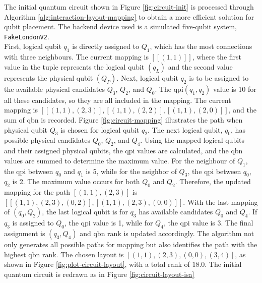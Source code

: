 \begin{example} %
The initial quantum circuit shown in Figure \ref{fig:circuit-init} is processed through Algorithm \ref{alg:interaction-layout-mapping}  to obtain a more efficient solution for qubit placement. The backend device used is a simulated five-qubit system, \lstinline{FakeLondonV2}. \\
First, logical qubit $q_1$ is directly assigned to $Q_1$, which has the most connections with three neighbours. The current mapping is $[[(1, 1)]]$, where the first value in the tuple represents the logical qubit $(q_L)$ and the second value represents the physical qubit $(Q_P)$. Next, logical qubit $q_2$ is to be assigned to the available physical candidates $Q_3$, $Q_2$, and $Q_0$. The \acrshort{qpi}$(q_1, q_2)$ value is 10 for all these candidates, so they are all included in the mapping. The current mapping is $[[(1, 1), (2, 3)], [(1, 1), (2, 2)], [(1, 1), (2, 0)]]$, and the sum of \acrshort{qbn} is recorded. Figure \ref{fig:circuit-mapping} illustrates the path when physical qubit $Q_3$ is chosen for logical qubit $q_2$. The next logical qubit, $q_0$, has possible physical candidates $Q_0$, $Q_2$, and $Q_4$. Using the mapped logical qubits and their assigned physical qubits, the \acrshort{qpi} values are calculated, and the \acrshort{qbn} values are summed to determine the maximum value. For the neighbour of $Q_1$, the \acrshort{qpi} between $q_0$ and $q_1$ is 5, while for the neighbor of $Q_3$, the \acrshort{qpi} between $q_0$, $q_2$ is 2. The maximum value occurs for both $Q_0$ and $Q_2$. Therefore, the updated mapping for the path $[(1, 1), (2, 3)]$ is $[[(1, 1), (2, 3), (0, 2)], [(1, 1), (2, 3), (0, 0)]]$. With the last mapping of $(q_0, Q_2)$, the last logical qubit is for $q_3$ has available candidates $Q_0$ and $Q_4$. If $q_3$ is assigned to $Q_0$, the \acrshort{qpi} value is 1, while for $Q_4$, the \acrshort{qpi} value is 3. The final assignment is $(q_3, Q_4)$ and \acrshort{qbn} rank is updated accordingly. The algorithm not only generates all possible paths for mapping but also identifies the path with the highest \acrshort{qbn} rank. The chosen layout is $[(1, 1), (2, 3), (0, 0), (3, 4)]$, as shown in Figure \ref{fig:plot-circuit-layout}, with a total rank of $18.0$. The initial quantum circuit is redrawn as in Figure \ref{fig:circuit-layout-isa}
\end{example}

